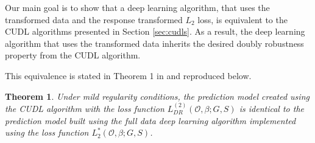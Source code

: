 \documentclass[12pt, a4paper]{scrartcl}
\theoremstyle{definition}
\theoremstyle{plain}
\newtheorem{Theorem}{Theorem}[section]
\numberwithin{equation}{section}
\numberwithin{figure}{section}
\numberwithin{table}{section}
\begin{document}
	Our main goal is to show that a deep learning algorithm, that uses the transformed data and the response transformed $L_2$ loss, is equivalent to the CUDL algorithms presented in Section \ref{sec:cudls}.
	As a result, the deep learning algorithm that uses the transformed data inherits the desired doubly robustness property from the CUDL algorithm.
	
	This equivalence is stated in Theorem 1 in \citet*{basearticle} and reproduced below.
	
	\begin{Theorem}\label{thm:equi}
		Under mild regularity conditions, the prediction model created using the CUDL algorithm with the loss function $L_{DR}^{(2)}(\mathcal{O}, \beta; G,S)$ is identical to the prediction model built using the full data deep learning algorithm implemented using the loss function $L_2^*(\mathcal{O}, \beta; G,S)$.
	\end{Theorem}
	
\end{document}
